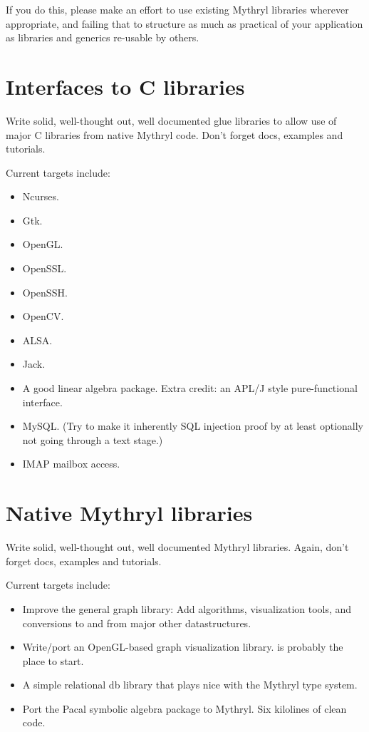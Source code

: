 If you do this, please make an effort to use existing Mythryl libraries 
wherever appropriate, and failing that to structure as much as practical 
of your application as libraries and generics re-usable by others.


\section{Interfaces to C libraries}

Write solid, well-thought out, well documented glue libraries 
to allow use of major C libraries from native Mythryl code. 
Don't forget docs, examples and tutorials.

Current targets include:

\begin{itemize}
\item Ncurses.
\item Gtk.
\item OpenGL.
\item OpenSSL.
\item OpenSSH.
\item OpenCV.
\item ALSA.
\item Jack.
\item A good linear algebra package.  Extra credit:  an APL/J style pure-functional interface.
\item MySQL. (Try to make it inherently SQL injection proof by at least optionally not going through a text stage.)
\item {\sc IMAP} mailbox access.
\end{itemize}




\section{Native Mythryl libraries}

Write solid, well-thought out, well documented Mythryl libraries. 
Again, don't forget docs, examples and tutorials.

Current targets include:

\begin{itemize}
\item Improve the general graph library:  Add algorithms, visualization tools, and conversions to and from major other datastructures.
\item Write/port an OpenGL-based graph visualization library.   is probably the place to start.
\item A simple relational db library that plays nice with the Mythryl type system.
\item Port the {\sc Pacal} symbolic algebra package to Mythryl. Six kilolines of clean code.
\end{itemize}


